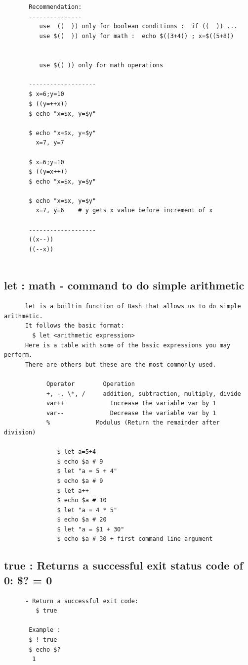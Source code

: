 \documentclass[a4paper,12pt]{article}
\begin{document}
\begin{verbatim}
       Recommendation:
       ---------------
          use  ((  )) only for boolean conditions :  if ((  )) ...
          use $((  )) only for math :  echo $((3+4)) ; x=$((5+8))  
             
          
          use $(( )) only for math operations
          
       -------------------   
       $ x=6;y=10
       $ ((y=++x))
       $ echo "x=$x, y=$y"
       
       $ echo "x=$x, y=$y"
         x=7, y=7

       $ x=6;y=10
       $ ((y=x++))
       $ echo "x=$x, y=$y"
       
       $ echo "x=$x, y=$y"
         x=7, y=6    # y gets x value before increment of x      
       
       -------------------    
       ((x--))
       ((--x)) 
         
\end{verbatim}



\subsection{let     : math - command to do simple arithmetic}
\begin{verbatim}
      let is a builtin function of Bash that allows us to do simple arithmetic. 
      It follows the basic format:
        $ let <arithmetic expression>
      Here is a table with some of the basic expressions you may perform. 
      There are others but these are the most commonly used.
      
            Operator	    Operation
            +, -, \*, /	    addition, subtraction, multiply, divide
            var++	          Increase the variable var by 1
            var--	          Decrease the variable var by 1
            %	          Modulus (Return the remainder after division)

               $ let a=5+4
               $ echo $a # 9
               $ let "a = 5 + 4"
               $ echo $a # 9
               $ let a++
               $ echo $a # 10
               $ let "a = 4 * 5"
               $ echo $a # 20
               $ let "a = $1 + 30"  
               $ echo $a # 30 + first command line argument   
\end{verbatim}






\subsection{true     : Returns a successful exit status code of 0: \$? = 0}
\begin{verbatim}
      - Return a successful exit code:
         $ true
         
       Example : 
       $ ! true
       $ echo $?
        1
         
\end{verbatim}
\end{document}

